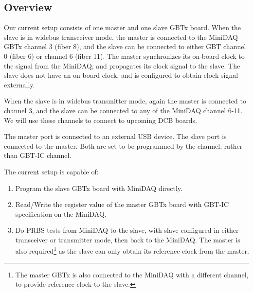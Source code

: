 \subsection{Overview}
Our current setup consists of one master and one slave GBTx board.
When the slave is in widebus transceiver mode,
the master is connected to the MiniDAQ GBTx channel 3 (fiber 8),
and the slave can be connected to either GBT channel 0 (fiber 6) or channel 6
(fiber 11).
The master synchronizes its on-board clock to the signal from the MiniDAQ,
and propagates its clock signal to the slave.
The slave does not have an on-board clock,
and is configured to obtain clock signal externally.

When the slave is in widebus transmitter mode,
again the master is connected to channel 3,
and the slave can be connected to any of the MiniDAQ channel 6-11.
We will use these channels to connect to upcoming DCB boards.

The master \itwoc port is connected to an external USB device.
The slave \itwoc port is connected to the master.
Both are set to be programmed by the \itwoc channel,
rather than GBT-IC channel.

The current setup is capable of:
\begin{enumerate}
    \item Program the slave GBTx board with MiniDAQ directly.
    \item Read/Write the register value of the master GBTx board with GBT-IC
        specification on the MiniDAQ.
    \item Do PRBS tests from MiniDAQ to the slave, with slave configured in
        either transceiver or transmitter mode, then back to the MiniDAQ.
        The master is also required\footnote{
            The master GBTx is also connected to the MiniDAQ with a different
        channel, to provide reference clock to the slave.}
        as the slave can only obtain its reference clock from the master.
\end{enumerate}
